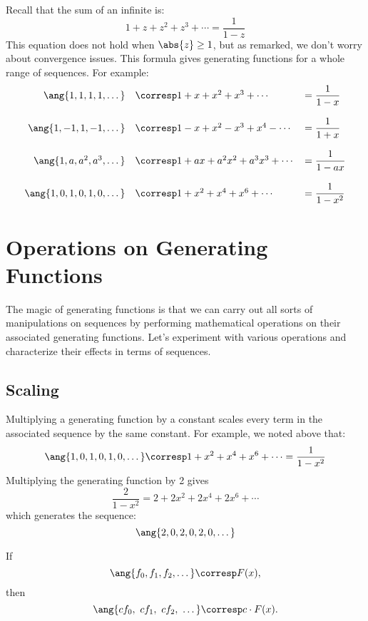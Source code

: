 Recall that the sum of an infinite  is:
%
\[
1 + z + z^2 + z^3 + \cdots = \frac{1}{1 - z}
\]
%
This equation does not hold when $\abs{z} \geq 1$, but as remarked, we
don't worry about convergence issues.  This formula gives  generating functions for a whole range of sequences.  For example:
%
\[
\begin{array}{rll}
\ang{1, 1, 1, 1, \dots}
    & \corresp 1 + x + x^2 + x^3 + \cdots
    & = \dfrac{1}{1-x} \\
\\
\ang{1, -1, 1, -1, \dots}
    & \corresp 1 - x + x^2 - x^3 + x^4 - \cdots
    &  = \dfrac{1}{1+x} \\
\\
\ang{1, a, a^2, a^3, \dots}
    & \corresp 1 + a x + a^2 x^2 + a^3 x^3 + \cdots
    &  = \dfrac{1}{1-ax} \\
\\
\ang{1, 0, 1, 0, 1, 0, \dots}
    & \corresp 1 + x^2 + x^4 + x^6 + \cdots
    & = \dfrac{1}{1 - x^2}
\end{array}
\]

\section{Operations on Generating Functions}

The magic of generating functions is that we can carry out all sorts
of manipulations on sequences by performing mathematical operations on
their associated generating functions.  Let's experiment with various
operations and characterize their effects in terms of sequences.

\subsection{Scaling}

Multiplying a generating function by a constant scales every term in
the associated sequence by the same constant.  For example, we noted
above that:
%
\[
\ang{1, 0, 1, 0, 1, 0, \dots}
    \corresp 1 + x^2 + x^4 + x^6 + \cdots = \frac{1}{1 - x^2}
\]
%
Multiplying the generating function by 2 gives
%
\[
\frac{2}{1 - x^2} = 2 + 2 x^2 + 2 x^4 + 2 x^6 + \cdots
\]
%
which generates the sequence:
%
\[
\ang{2, 0, 2, 0, 2, 0, \dots}
\]

\begin{mathrule}
\label{rule:scaling}
If
\[\ang{f_0, f_1, f_2, \dots} \corresp F(x),\]
then
%
\[
\ang{c f_0,\ c f_1,\ c f_2,\ \dots} \corresp c \cdot F(x).
\]
\end{mathrule}

